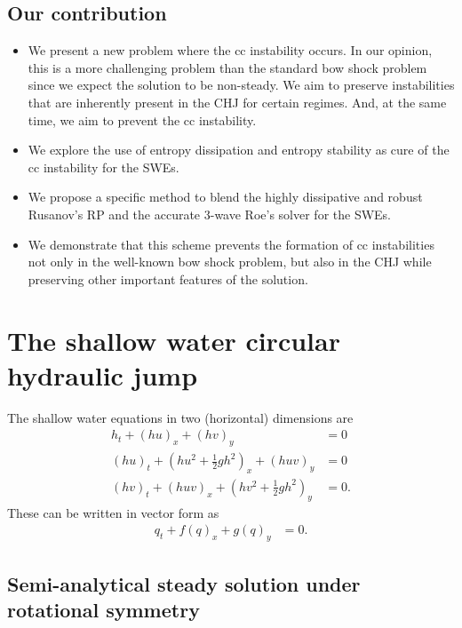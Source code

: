 \documentclass[preprint, 11pt]{article}
\begin{document}
\subsection{Our contribution}
\begin{itemize}
\item We present a new problem where the cc instability occurs. In our opinion, this is a more challenging 
  problem than the standard bow shock problem since we expect the solution to be non-steady. 
  We aim to preserve instabilities that are inherently present in the CHJ for certain regimes. And, 
  at the same time, we aim to prevent the cc instability. 
\item We explore the use of entropy dissipation and entropy stability as cure of the cc instability for the SWEs. 
\item We propose a specific method to blend the highly dissipative and robust Rusanov's RP and the 
  accurate 3-wave Roe's solver for the SWEs. 
\item We demonstrate that this scheme prevents the formation of cc instabilities not only 
  in the well-known bow shock problem, but also in the CHJ while preserving other important features of 
  the solution. 
\end{itemize}


\section{The shallow water circular hydraulic jump}
The shallow water equations in two (horizontal) dimensions are
\begin{subequations} \label{eq:sw}
\begin{align}
    h_t + (hu)_x + (hv)_y & = 0 \\
    (hu)_t + \left(hu^2 + \frac{1}{2}gh^2\right)_x + (huv)_y & = 0 \\
    (hv)_t + (huv)_x + \left(hv^2 + \frac{1}{2}gh^2\right)_y & = 0.
\end{align}
\end{subequations}
These can be written in vector form as
\begin{align}
    q_t + f(q)_x + g(q)_y & = 0.
\end{align}

\subsection{Semi-analytical steady solution under rotational symmetry}\label{sec:steady_chj}
\end{document}
